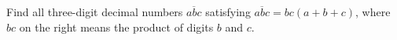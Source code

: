 Find all three-digit decimal numbers $\overline{abc}$ satisfying $\overline{abc}=bc(a+b+c)$, where $bc$ on the right means the product of digits $b$ and $c$.
